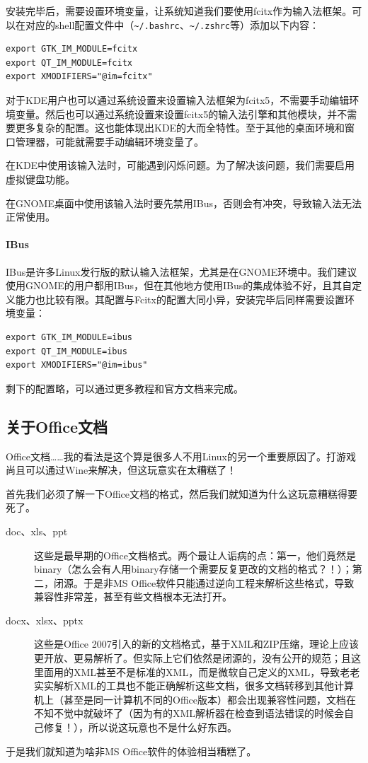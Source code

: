 安装完毕后，需要设置环境变量，让系统知道我们要使用fcitx作为输入法框架。可以在对应的shell配置文件中（\verb|~/.bashrc|、\verb|~/.zshrc|等）添加以下内容：
\begin{verbatim}
export GTK_IM_MODULE=fcitx
export QT_IM_MODULE=fcitx
export XMODIFIERS="@im=fcitx"
\end{verbatim}
对于KDE用户也可以通过系统设置来设置输入法框架为fcitx5，不需要手动编辑环境变量。然后也可以通过系统设置来设置fcitx5的输入法引擎和其他模块，并不需要更多复杂的配置。这也能体现出KDE的大而全特性。至于其他的桌面环境和窗口管理器，可能就需要手动编辑环境变量了。

在KDE中使用该输入法时，可能遇到闪烁问题。为了解决该问题，我们需要启用虚拟键盘功能。

在GNOME桌面中使用该输入法时要先禁用IBus，否则会有冲突，导致输入法无法正常使用。

\paragraph{IBus} IBus是许多Linux发行版的默认输入法框架，尤其是在GNOME环境中。我们建议使用GNOME的用户都用IBus，但在其他地方使用IBus的集成体验不好，且其自定义能力也比较有限。其配置与Fcitx的配置大同小异，安装完毕后同样需要设置环境变量：
\begin{verbatim}
export GTK_IM_MODULE=ibus
export QT_IM_MODULE=ibus
export XMODIFIERS="@im=ibus"
\end{verbatim}
剩下的配置略，可以通过更多教程和官方文档来完成。

\subsection{关于Office文档}

Office文档……我的看法是这个算是很多人不用Linux的另一个重要原因了。打游戏尚且可以通过Wine来解决，但这玩意实在太糟糕了！

首先我们必须了解一下Office文档的格式，然后我们就知道为什么这玩意糟糕得要死了。
\begin{description}
  \item[doc、xls、ppt] 这些是最早期的Office文档格式。两个最让人诟病的点：第一，他们竟然是binary（怎么会有人用binary存储一个需要反复更改的文档的格式？！）；第二，闭源。于是非MS Office软件只能通过逆向工程来解析这些格式，导致兼容性非常差，甚至有些文档根本无法打开。
  \item[docx、xlsx、pptx] 这些是Office 2007引入的新的文档格式，基于XML和ZIP压缩，理论上应该更开放、更易解析了。但实际上它们依然是闭源的，没有公开的规范；且这里面用的XML甚至不是标准的XML，而是微软自己定义的XML，导致老老实实解析XML的工具也不能正确解析这些文档，很多文档转移到其他计算机上（甚至是同一计算机不同的Office版本）都会出现兼容性问题，文档在不知不觉中就破坏了（因为有的XML解析器在检查到语法错误的时候会自己修复！），所以说这玩意也不是什么好东西。
\end{description}
于是我们就知道为啥非MS Office软件的体验相当糟糕了。

